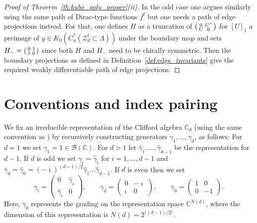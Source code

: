 \documentclass[12pt]{amsart}
\newcommand{\CM}{{\mathbb C}}
\newcommand{\Bb}{{\mathcal B}}
\newcommand{\Zz}{{\mathcal Z}}
\newcommand{\scalarmatrix}{H_-}
\begin{document}
\begin{proof}[Proof of Theorem~\ref{th:kubo_poly_proper}(ii)]
In the odd case one argues similarly using the same path of Dirac-type functions $f^t$ but one needs a path of edge projections instead. For that, one defines $H$ as a truncation of $\begin{psmallmatrix}
    0 & U^*\\ U & 0
\end{psmallmatrix}$ for $[U]_1$ a preimage of $y\in K_0(C^*_u(\Zz_d^t\subset \Lambda))$ under the boundary map and sets $\scalarmatrix=\begin{psmallmatrix}
    0 & 1\\ 1 & 0
\end{psmallmatrix}$ since both $H$ and $\scalarmatrix$ need to be chirally symmetric. Then the boundary projections as defined in Definition~\ref{def:edge_invariants} give the required weakly differentiable path of edge projections.

\end{proof}


\appendix

\section{Conventions and index pairing}
\label{sec:index}
We fix an irreducible representation of the Clifford algebra $\CM_d$  (using the same convention as \cite{ProdanSchulzBaldes2016,SchulzBaldesStoiber2023}) by recursively constructing generators $\gamma_1,\dots,\gamma_d$, as follows:
For $d=1$ we set $\gamma_1=1 \in \Bb(\CM)$. For $d>1$ let $\hat{\gamma}_1, \dots, \hat{\gamma}_{d-1}$ be the representation for $d-1$. If $d$ is odd we set $\gamma_i=\hat{\gamma}_i$ for $i=1,\dots,d-1$ and $\gamma_d= \hat{\gamma}_0= (-\imath)^{(d-1)/2}\hat{\gamma}_1\dots\hat{\gamma}_{d-1}$. If $d$ is even then we set
$$\gamma_i= \begin{pmatrix}
    0 & \hat{\gamma}_i \\ \hat{\gamma}_i & 0
\end{pmatrix}, \qquad \gamma_d = \begin{pmatrix}
    0 & -\imath \\ \imath & 0
\end{pmatrix}, \qquad \gamma_0 = \begin{pmatrix}
    1 & 0 \\ 0 & -1
\end{pmatrix}.$$
Here, $\gamma_0$ represents the grading on the representation space $\CM^{N(d)}$, where the dimension of this representation is $N(d)=2^{\lceil (d-1)/2 \rceil}$.
\end{document}
